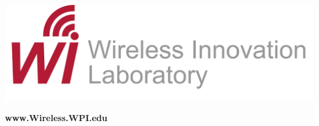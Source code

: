 \documentclass[a0,portrait]{a0poster}
\begin{document}
\vspace{2cm}
\begin{minipage}[b]{0.3\linewidth}
\strut\vspace*{-\baselineskip}\newline\includegraphics[width=25cm]{wilab_logo.jpg}
\end{minipage}
\hspace{0.01cm}
\begin{minipage}[b]{0.3\linewidth}
\hspace{20mm}
\vspace{10mm}
\color{wpi_red} \textbf{\textsf{\fontsize{138}{60}\selectfont www.Wireless.WPI.edu}}
\end{minipage}
\hspace{16cm}
\end{document}
